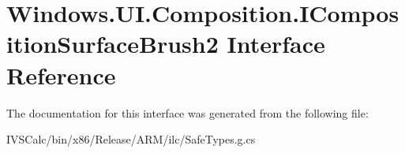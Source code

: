 \hypertarget{interface_windows_1_1_u_i_1_1_composition_1_1_i_composition_surface_brush2}{}\section{Windows.\+U\+I.\+Composition.\+I\+Composition\+Surface\+Brush2 Interface Reference}
\label{interface_windows_1_1_u_i_1_1_composition_1_1_i_composition_surface_brush2}


The documentation for this interface was generated from the following file\+:\begin{DoxyCompactItemize}
\item 
I\+V\+S\+Calc/bin/x86/\+Release/\+A\+R\+M/ilc/Safe\+Types.\+g.\+cs\end{DoxyCompactItemize}
